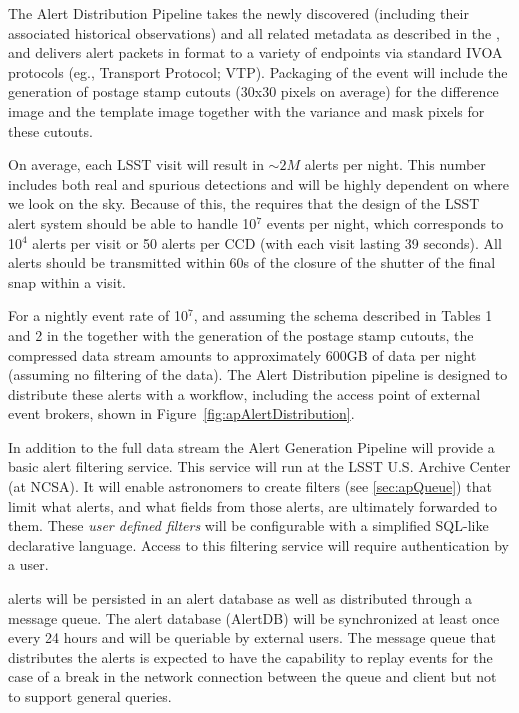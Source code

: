The Alert Distribution Pipeline takes the newly discovered \DIAObjects (including their associated historical observations) and all related metadata as described in the \DPDD, and delivers alert packets in \VOEvent format to a variety of endpoints via standard IVOA protocols (eg., \VOEvent Transport Protocol; VTP\@). Packaging of the event will include the generation of postage stamp cutouts (30x30 pixels on average) for the difference image and the template image together with the variance and mask pixels for these cutouts.

On average, each LSST visit will result in $\sim 2M$ alerts per night. This number includes both real and spurious detections and will be highly dependent on where we look on the sky. Because of this, the \SRD requires that the design of the LSST alert system should be able to handle 10$^7$ events per night, which corresponds to 10$^4$ alerts per visit or 50 alerts per CCD (with each visit lasting 39 seconds). All alerts should be transmitted within 60s of the closure of the shutter of the final snap within a visit.

For a nightly event rate of 10$^7$, and assuming the schema described in Tables 1 and 2 in the \DPDD together with the generation of the postage stamp cutouts, the compressed \VOEvents data stream amounts to approximately 600GB of data per night (assuming no filtering of the data).  The Alert Distribution pipeline is designed to distribute these alerts with a workflow, including the access point of external event brokers, shown in Figure~\ref{fig:apAlertDistribution}.

In addition to the full data stream the Alert Generation Pipeline will provide a basic alert filtering service. This service will run at the LSST U.S. Archive Center (at NCSA). It will enable astronomers to create filters (see  \ref{sec:apQueue}) that limit what alerts, and what fields from those alerts, are ultimately forwarded to them. These \emph{user defined filters} will be configurable with a simplified SQL-like declarative language. Access to this filtering service will require authentication by a user.

\VOEvent alerts will be persisted in an alert database as well as distributed through a message queue. The alert database (AlertDB) will be synchronized at least once every 24 hours and will be queriable by external users. The message queue that distributes the alerts is expected to have the capability  to replay events for the case of a break in the network connection between the queue and client but not to support general queries.

